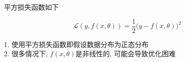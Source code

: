\documentclass[../main.tex]{subfiles}
\begin{document}
平方损失函数如下

$$
\mathcal{L}(y, f(x, \theta)) = \frac{1}{2} \big( y - f(x, \theta) \big)^2
$$

1. 使用平方损失函数即假设数据分布为正态分布 \\
2. 很多情况下, $f(x,\theta)$是非线性的, 可能会导致优化困难
\end{document}
